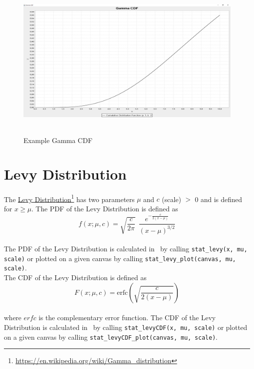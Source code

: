 		\begin{figure}[H]
			\centering
			\includegraphics[width=1\textwidth]{Figures/implemented_functions/gamma_cdf}~\\
			\caption{Example Gamma CDF}
			\label{fig:gamma_cdf}
		\end{figure}


	\section{Levy Distribution}
	
		The \href{https://en.wikipedia.org/wiki/Gamma_distribution}{Levy Distribution}\footnote{\url{https://en.wikipedia.org/wiki/Gamma_distribution}} has two parameters $\mu$ and $c$ (scale) $>$ 0 and is defined for $x \geq \mu$. The \ac{PDF} of the Levy Distribution is defined as
		\\[0.3cm]
		$$f(x;\mu,c)=\sqrt{\frac{c}{2\pi}}~~\frac{e^{ -\frac{c}{2(x-\mu)}}} {(x-\mu)^{3/2}}$$
		\\[0.3cm]
		The \ac{PDF} of the Levy Distribution is calculated in \setlx\ by calling \lstinline{stat_levy(x, mu, scale)} or plotted on a given canvas by calling \lstinline{stat_levy_plot(canvas, mu, scale)}.
		\\[0.3cm]
		The \ac{CDF} of the Levy Distribution is defined as
		\\[0.3cm]
		$$F(x;\mu,c)=\textrm{erfc}\left(\sqrt{\frac{c}{2(x-\mu)}}\right)$$
		\\[0.3cm]
		where $erfc$ is the complementary error function.
		The \ac{CDF} of the Levy Distribution is calculated in \setlx\ by calling \lstinline{stat_levyCDF(x, mu, scale)} or plotted on a given canvas by calling \lstinline{stat_levyCDF_plot(canvas, mu, scale)}.

